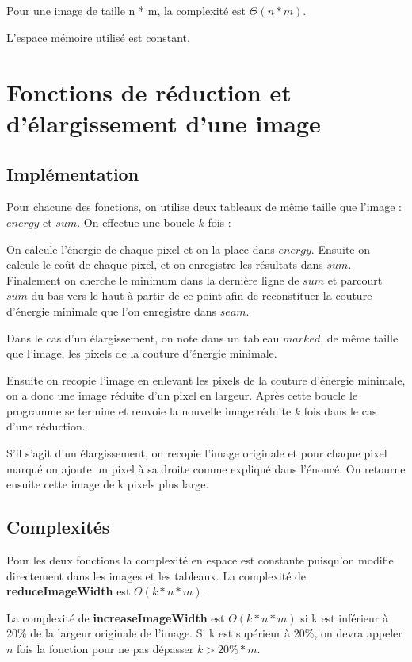 \subsection{} %
Pour une image de taille n * m, la complexité est $\Theta(n * m)$.

L'espace mémoire utilisé est constant.

\section{Fonctions de réduction et d'élargissement d'une image} %
\subsection{Implémentation} %
Pour chacune des fonctions, on utilise deux tableaux de même taille que l'image : $energy$ et $sum$. 
On effectue une boucle $k$ fois :

On calcule l'énergie de chaque pixel et on la place dans $energy$.
Ensuite on calcule le coût de chaque pixel, et on enregistre les résultats dans $sum$.
Finalement on cherche le minimum dans la dernière ligne de $sum$ et parcourt $sum$ du bas vers le haut à partir de ce point afin de reconstituer la couture d'énergie minimale que l'on enregistre dans $seam$.

Dans le cas d'un élargissement, on note dans un tableau $marked$, de même taille que l'image, les pixels de la couture d'énergie minimale.

Ensuite on recopie l'image en enlevant les pixels de la couture d'énergie minimale, on a donc une image réduite d'un pixel en largeur.
\bigbreak
Après cette boucle le programme se termine et renvoie la nouvelle image réduite $k$ fois dans le cas d'une réduction. 

S'il s'agit d'un élargissement, on recopie l'image originale et pour chaque pixel marqué on ajoute un pixel à sa droite comme expliqué dans l'énoncé. On retourne ensuite cette image de k pixels plus large.
\subsection{Complexités} %
Pour les deux fonctions la complexité en espace est constante puisqu'on modifie directement dans les images et les tableaux.
La complexité de \textbf{reduceImageWidth} est $\Theta(k*n*m)$.

La complexité de \textbf{increaseImageWidth} est $\Theta(k*n*m)$ si k est inférieur à 20\% de la largeur originale de l'image. Si k est supérieur à 20\%, on devra appeler $n$ fois la fonction pour ne pas dépasser $k > 20\% * m$.

